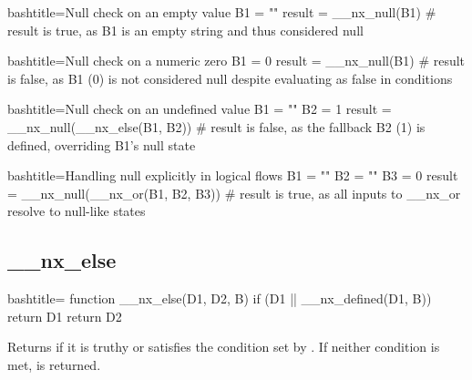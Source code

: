 \begin{NexCodeBox}{bash}{title={Null check on an empty value}}
	B1 = ""
	result = __nx_null(B1)
	# result is true, as B1 is an empty string and thus considered null
\end{NexCodeBox}

\begin{NexCodeBox}{bash}{title={Null check on a numeric zero}}
	B1 = 0
	result = __nx_null(B1)
	# result is false, as B1 (0) is not considered null despite evaluating as false in conditions
\end{NexCodeBox}

\begin{NexCodeBox}{bash}{title={Null check on an undefined value}}
	B1 = ""
	B2 = 1
	result = __nx_null(__nx_else(B1, B2))
	# result is false, as the fallback B2 (1) is defined, overriding B1’s null state
\end{NexCodeBox}


\begin{NexCodeBox}{bash}{title={Handling null explicitly in logical flows}}
	B1 = ""
	B2 = ""
	B3 = 0
	result = __nx_null(__nx_or(B1, B2, B3))
	# result is true, as all inputs to __nx_or resolve to null-like states
\end{NexCodeBox}

\newpage
\subsection{__nx_else}
\label{__nx_else}
\begin{NexCodeBox}{bash}{title={}}
function __nx_else(D1, D2, B) {
	if (D1 || __nx_defined(D1, B))
		return D1
	return D2
}
\end{NexCodeBox}

\begin{NexMainBox}
	\begin{NexMainBox}
		Returns  if it is truthy or satisfies the condition set by . If neither condition is met,  is returned.
	\end{NexMainBox}
	\begin{NexMainBox}
		\begin{NexListDark}
		\end{NexListDark}
	\end{NexMainBox}
\end{NexMainBox}

